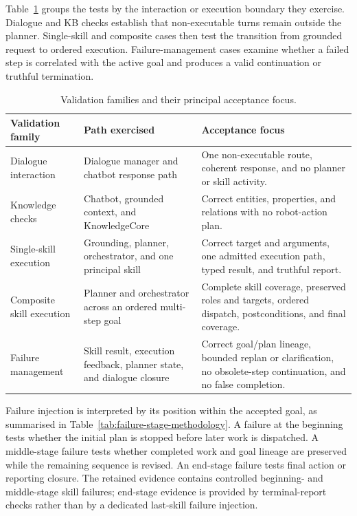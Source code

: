 Table~\ref{tab:validation-boundary-families} groups the tests by the interaction or execution boundary they exercise. Dialogue and KB checks establish that non-executable turns remain outside the planner. Single-skill and composite cases then test the transition from grounded request to ordered execution. Failure-management cases examine whether a failed step is correlated with the active goal and produces a valid continuation or truthful termination.

\begin{table}[H]
\centering
\footnotesize
\renewcommand{\arraystretch}{1.08}
\caption{Validation families and their principal acceptance focus.}
\label{tab:validation-boundary-families}
\begin{tabularx}{\textwidth}{@{}>{\RaggedRight\arraybackslash}p{}>{\RaggedRight\arraybackslash}p{}>{\RaggedRight\arraybackslash}X@{}}
\toprule
\textbf{Validation family} & \textbf{Path exercised} & \textbf{Acceptance focus}\\
\midrule
Dialogue interaction & Dialogue manager and chatbot response path & One non-executable route, coherent response, and no planner or skill activity.\\
Knowledge checks & Chatbot, grounded context, and KnowledgeCore & Correct entities, properties, and relations with no robot-action plan.\\
Single-skill execution & Grounding, planner, orchestrator, and one principal skill & Correct target and arguments, one admitted execution path, typed result, and truthful report.\\
Composite skill execution & Planner and orchestrator across an ordered multi-step goal & Complete skill coverage, preserved roles and targets, ordered dispatch, postconditions, and final coverage.\\
Failure management & Skill result, execution feedback, planner state, and dialogue closure & Correct goal/plan lineage, bounded replan or clarification, no obsolete-step continuation, and no false completion.\\
\bottomrule
\end{tabularx}
\end{table}

Failure injection is interpreted by its position within the accepted goal, as summarised in Table~\ref{tab:failure-stage-methodology}. A failure at the beginning tests whether the initial plan is stopped before later work is dispatched. A middle-stage failure tests whether completed work and goal lineage are preserved while the remaining sequence is revised. An end-stage failure tests final action or reporting closure. The retained evidence contains controlled beginning- and middle-stage skill failures; end-stage evidence is provided by terminal-report checks rather than by a dedicated last-skill failure injection.

